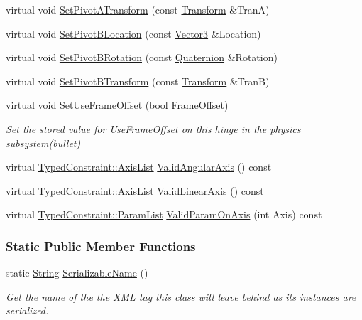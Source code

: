 \begin{DoxyCompactItemize}
virtual void \hyperlink{classMezzanine_1_1Generic6DofConstraint_a88f26ccb9a6ec67adc743d4bc7c86ddf}{SetPivotATransform} (const \hyperlink{classMezzanine_1_1Transform}{Transform} \&TranA)
\item 
virtual void \hyperlink{classMezzanine_1_1Generic6DofConstraint_a1b5fc577a2c627266436fd5b134728bc}{SetPivotBLocation} (const \hyperlink{classMezzanine_1_1Vector3}{Vector3} \&Location)
\item 
virtual void \hyperlink{classMezzanine_1_1Generic6DofConstraint_afd149f6868de162f75a3e2293d6c143d}{SetPivotBRotation} (const \hyperlink{classMezzanine_1_1Quaternion}{Quaternion} \&Rotation)
\item 
virtual void \hyperlink{classMezzanine_1_1Generic6DofConstraint_adaa5bb038814aa287773f56d40e90210}{SetPivotBTransform} (const \hyperlink{classMezzanine_1_1Transform}{Transform} \&TranB)
\item 
virtual void \hyperlink{classMezzanine_1_1Generic6DofConstraint_a1181f8eed94d0e8ec4d5b7230e241d95}{SetUseFrameOffset} (bool FrameOffset)
\begin{DoxyCompactList}\small\item\em Set the stored value for UseFrameOffset on this hinge in the physics subsystem(bullet) \item\end{DoxyCompactList}\item 
virtual \hyperlink{classMezzanine_1_1TypedConstraint_ac6b8e0839cd686f73d0c9e9ad5db47a4}{TypedConstraint::AxisList} \hyperlink{classMezzanine_1_1Generic6DofConstraint_a8a908f5f3857262db217a7f2dfc25c61}{ValidAngularAxis} () const 
\item 
virtual \hyperlink{classMezzanine_1_1TypedConstraint_ac6b8e0839cd686f73d0c9e9ad5db47a4}{TypedConstraint::AxisList} \hyperlink{classMezzanine_1_1Generic6DofConstraint_a94db83422c1984cdbe1745662715ac9d}{ValidLinearAxis} () const 
\item 
virtual \hyperlink{classMezzanine_1_1TypedConstraint_abd499db29c9e9755e9bb547d29eaa49a}{TypedConstraint::ParamList} \hyperlink{classMezzanine_1_1Generic6DofConstraint_a2417bed78c50820d2b5b8d083a8897d6}{ValidParamOnAxis} (int Axis) const 
\end{DoxyCompactItemize}
\subsubsection*{Static Public Member Functions}
\begin{DoxyCompactItemize}
\item 
static \hyperlink{namespaceMezzanine_acf9fcc130e6ebf08e3d8491aebcf1c86}{String} \hyperlink{classMezzanine_1_1Generic6DofConstraint_acac3b309c947c1cd60635df1c7b46867}{SerializableName} ()
\begin{DoxyCompactList}\small\item\em Get the name of the the XML tag this class will leave behind as its instances are serialized. \item\end{DoxyCompactList}\end{DoxyCompactItemize}
